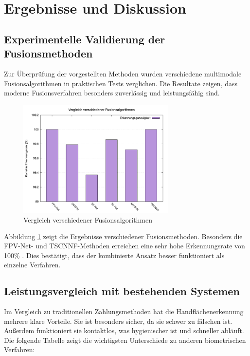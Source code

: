 \documentclass[paper=a4,fontsize=12pt,ngerman]{scrartcl}
\begin{document}
\vspace{1.5cm}



\vspace{2cm}

\section{Ergebnisse und Diskussion}

\subsection{Experimentelle Validierung der Fusionsmethoden}
Zur Überprüfung der vorgestellten Methoden wurden verschiedene multimodale Fusionsalgorithmen in praktischen Tests verglichen. Die Resultate zeigen, dass moderne Fusionsverfahren besonders zuverlässig und leistungsfähig sind.

\begin{figure}[h!]
\begin{center}
  \includegraphics[width=0.7\textwidth]{graphics/fusion_algorithms_comparison.png}
  \caption{Vergleich verschiedener Fusionsalgorithmen}
  \label{fig:fusion-comparison}
\end{center}
\end{figure}

Abbildung \ref{fig:fusion-comparison} zeigt die Ergebnisse verschiedener Fusionsmethoden. Besonders die FPV-Net- und TSCNNF-Methoden erreichen eine sehr hohe Erkennungsrate von 100\% . Dies bestätigt, dass der kombinierte Ansatz besser funktioniert als einzelne Verfahren.\cite{pan2024palm}

\vspace{1.5cm}

\subsection{Leistungsvergleich mit bestehenden Systemen}
Im Vergleich zu traditionellen Zahlungsmethoden hat die Handflächenerkennung mehrere klare Vorteile. Sie ist besonders sicher, da sie schwer zu fälschen ist. Außerdem funktioniert sie kontaktlos, was hygienischer ist und schneller abläuft. Die folgende Tabelle zeigt die wichtigsten Unterschiede zu anderen biometrischen Verfahren:
\end{document}
